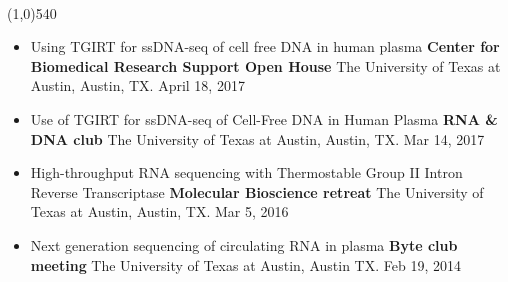 \documentclass[dvips,11pt]{article}
\begin{document}
 \vspace{-1.5mm}
\\\noindent
\line(1,0){540}\\
\vspace{-6mm}
\begin{itemize}
	\setlength{\itemsep}{0pt}
	\item Using TGIRT for ssDNA-seq of cell free DNA in human plasma 
	\newline
		{\bf Center for Biomedical Research Support Open House }\newline
		The University of Texas at Austin, Austin, TX. April 18, 2017
	\item Use of TGIRT for ssDNA-seq of Cell-Free DNA in Human Plasma 
	\newline
		{\bf RNA \& DNA club} \newline
		The University of Texas at Austin, Austin, TX. Mar 14, 2017
	\item High-throughput RNA sequencing with Thermostable Group II Intron Reverse Transcriptase \newline
		{\bf Molecular Bioscience retreat} \newline
		The University of Texas at Austin, Austin, TX. Mar 5, 2016
	\item Next generation sequencing of circulating RNA in plasma \newline
		{\bf Byte club meeting} \newline
		The University of Texas at Austin, Austin TX. Feb 19, 2014
\end{itemize}
\end{document}

